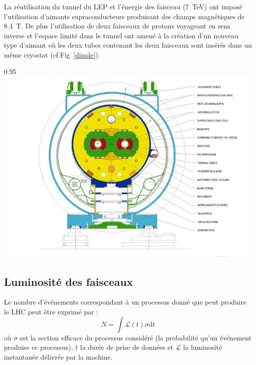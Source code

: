 La réutilisation du tunnel du LEP et l'énergie des faisceau (\SI{7}{\tera\eV}) ont imposé l'utilisation d'aimants supraconducteurs produisant des champs magnétiques de \SI{8.4}{\tesla}. De plus l'utilisation de deux faisceaux de protons voyageant en sens inverse et l'espace limité dans le tunnel ont amené à la création d'un nouveau type d'aimant où les deux tubes contenant les deux faisceaux sont insérés dans un même cryostat (cf.Fig~\ref{dipole}).

\begin{minipagewithmarginpars}[ht!]{0.95\textwidth}
\centering
\includegraphics[width=1.0\textwidth]{LHC/dipole.jpg}
\label{dipole}	
\end{minipagewithmarginpars}

\subsection{Luminosité des faisceaux}
Le nombre d'événements correspondant à un processus donné que peut produire le LHC peut être exprimé par :
\begin{equation}
N=\int \mathcal{L}(t)\sigma \mathrm dt
\end{equation}
où $\sigma$ est la section efficace du processus considéré (la probabilité qu'un événement produise ce processus), $t$ la durée de prise de données et $\mathcal{L}$ la luminosité instantanée délivrée par la machine.


